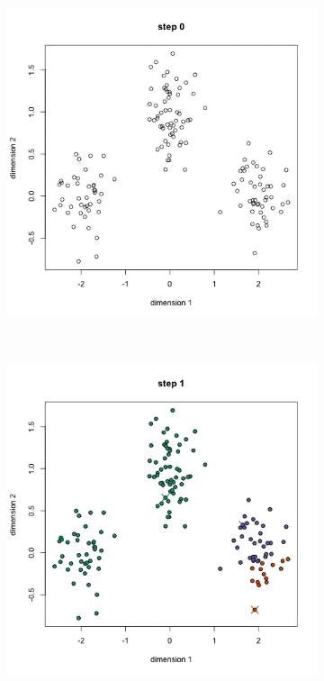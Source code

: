 \documentclass[a4paper, 14pt]{extarticle}
\begin{document}
\begin{figure}
	\centering
	\begin{subfigure}[b]{0.3\textwidth}
		\includegraphics[width=\textwidth]{k_0}
		\caption{}
	\end{subfigure}
	~
	\begin{subfigure}[b]{0.3\textwidth}
		\includegraphics[width=\textwidth]{k_1}

\end{subfigure}
\end{figure}
\end{document}
